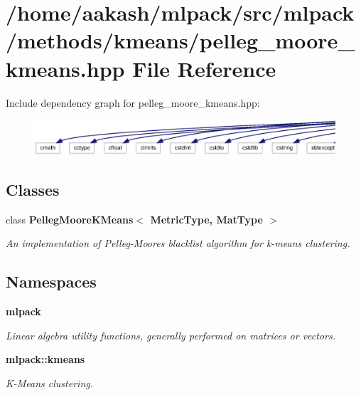 \section{/home/aakash/mlpack/src/mlpack/methods/kmeans/pelleg\+\_\+moore\+\_\+kmeans.hpp File Reference}
\label{pelleg__moore__kmeans_8hpp}
Include dependency graph for pelleg\+\_\+moore\+\_\+kmeans.\+hpp\+:
\nopagebreak
\begin{figure}[H]
\begin{center}
\leavevmode
\includegraphics[width=350pt]{pelleg__moore__kmeans_8hpp__incl}
\end{center}
\end{figure}
\subsection*{Classes}
\begin{DoxyCompactItemize}
\item 
class \textbf{ Pelleg\+Moore\+K\+Means$<$ Metric\+Type, Mat\+Type $>$}
\begin{DoxyCompactList}\small\item\em An implementation of Pelleg-\/\+Moore\textquotesingle{}s \textquotesingle{}blacklist\textquotesingle{} algorithm for k-\/means clustering. \end{DoxyCompactList}\end{DoxyCompactItemize}
\subsection*{Namespaces}
\begin{DoxyCompactItemize}
\item 
 \textbf{ mlpack}
\begin{DoxyCompactList}\small\item\em Linear algebra utility functions, generally performed on matrices or vectors. \end{DoxyCompactList}\item 
 \textbf{ mlpack\+::kmeans}
\begin{DoxyCompactList}\small\item\em K-\/\+Means clustering. \end{DoxyCompactList}\end{DoxyCompactItemize}


